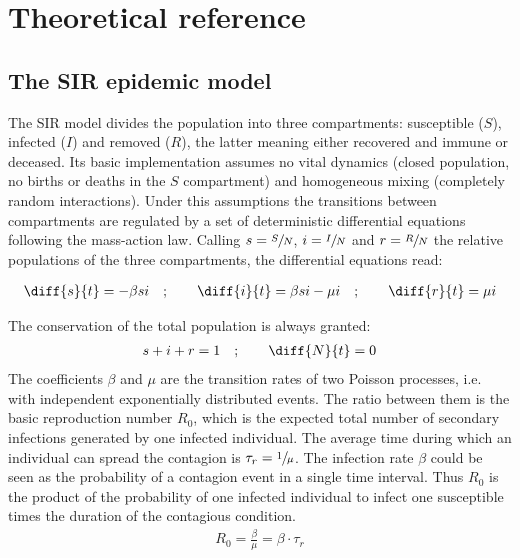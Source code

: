 \documentclass[DIV=12, BCOR=0pt]{scrartcl}  %
\begin{document}
  
  \section{Theoretical reference}
  \subsection{The SIR epidemic model}
  The SIR model divides the population into three compartments: susceptible ($S$), infected ($I$) and removed ($R$), the latter meaning either recovered and immune or deceased. Its basic implementation assumes no vital dynamics (closed population, no births or deaths in the $S$ compartment) and homogeneous mixing (completely random interactions). Under this assumptions the transitions between compartments are regulated by a set of deterministic differential equations following the mass-action law. Calling $s = \sfrac{S}{N}$, $i = \sfrac{I}{N}$ and $r = \sfrac{R}{N}$ the relative populations of the three compartments, the differential equations read:
  
  \begin{align}
  	\diff{s}{t} = - \beta s i \quad;  \qquad 	\diff{i}{t} = \beta s i - \mu i \quad; \qquad  \diff{r}{t} = \mu i
  \end{align}
  
  The conservation of the total population is always granted: %
  \begin{align}
  	s + i + r = 1 \quad ; \qquad \diff{N}{t}= 0
  \end{align}
  The coefficients $\beta$ and $\mu$ are the transition rates of two Poisson processes, i.e. with independent exponentially distributed events. The ratio between them is the basic reproduction number $R_0$, which is the expected total number of secondary infections generated by one infected individual.   
  The average time during which an individual can spread the contagion is $\tau_{r} = \sfrac{1}{\mu}$. The infection rate $\beta$ could be seen as the probability of a contagion event in a single time interval. Thus $R_0$ is the product of the probability of one infected individual to infect one susceptible times the duration of the contagious condition.
  \begin{align}
			R_0 = \frac{\beta}{\mu} = \beta \cdot \tau_{r}
  \end{align}
  
\end{document}
